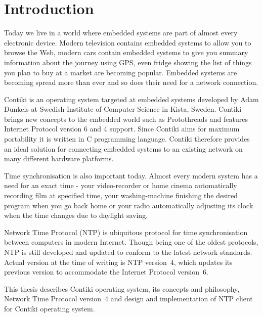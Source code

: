 
\chapter{Introduction}
Today we live in a world where embedded systems are part of almost every electronic device.
Modern television contains embedded systems to allow you to browse the Web,
modern cars contain embedded systems to give you summary information
about the journey using GPS, even fridge showing the list of things you plan to buy at a market are becoming popular.
Embedded systems are becoming spread more than ever and so does
their need for a network connection.

Contiki is an operating system targeted at embedded systems
developed by Adam Dunkels at Swedish Institute of Computer Science in Kista, Sweden.
Contiki brings new concepts to the embedded world such as Protothreads and features
Internet Protocol version 6 and 4 support.
Since Contiki aims for maximum portability it is written in C programming language.
Contiki therefore provides an ideal solution for connecting
embedded systems to an existing network on many different hardware platforms.

Time synchronisation is also important today.
Almost every modern system has a need for an exact time -
your video-recorder or home cinema automatically recording film at specified time, your washing-machine finishing the
desired program when you go back home or your radio automatically adjusting its clock when the time changes
due to daylight saving.

Network Time Protocol (NTP) is ubiquitous protocol for time synchronisation between computers in modern Internet.
Though being one of the oldest protocols, NTP is still developed and updated to conform to the latest
network standards. Actual version at the time of writing is NTP version~4, which updates its previous version to
accommodate the Internet Protocol version~6.

This thesis describes Contiki operating system, its concepts and philosophy,
Network Time Protocol version~4 and design and implementation of NTP client for Contiki operating system.










